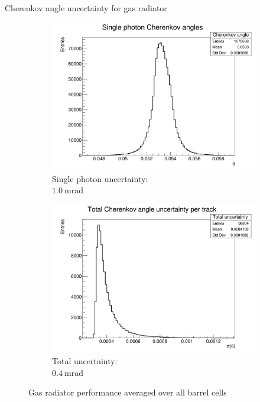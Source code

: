 \documentclass{beamer}
\begin{document}
\begin{frame}{Cherenkov angle uncertainty for gas radiator}
\begin{figure}
\begin{subfigure}{0.35\textwidth}
      \includegraphics[width = 1.0\textwidth]{Plots/SinglePhotonCherenkovAngles_Barrel_Gas.png}
      \vspace{-0.75cm}
      \caption{Single photon uncertainty:\\ $\SI{1.0}{\milli\radian}$}
    \end{subfigure}%
    \begin{subfigure}{0.35\textwidth}
      \includegraphics[width = 1.0\textwidth]{Plots/TotalCherenkovUncertainty_Barrel_Gas.png}
      \vspace{-0.75cm}
      \caption{Total uncertainty:\\ $\SI{0.4}{\milli\radian}$}
    \end{subfigure}
    \vspace{-0.1cm}
    \caption{Gas radiator performance averaged over all barrel cells}
  \end{figure}
\end{frame}
\end{document}
